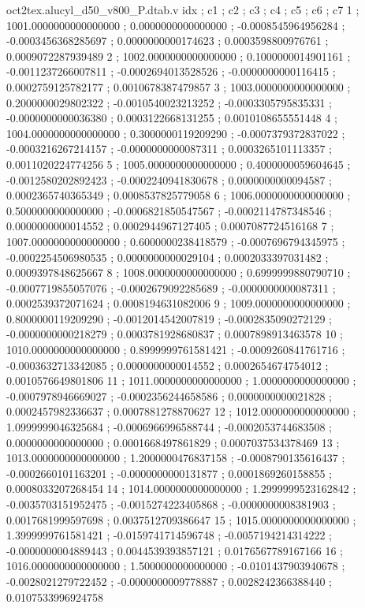 \begin{filecontents}[overwrite]{oct2tex.alucyl_d50_v800_P.dtab.v}
idx ; c1 ; c2 ; c3 ; c4 ; c5 ; c6 ; c7
1 ; 1001.0000000000000000 ; 0.0000000000000000 ; -0.0008545964956284 ; -0.0003456368285697 ; 0.0000000000174623 ; 0.0003598800976761 ; 0.0009072287939489
2 ; 1002.0000000000000000 ; 0.1000000014901161 ; -0.0011237266007811 ; -0.0002694013528526 ; -0.0000000000116415 ; 0.0002759125782177 ; 0.0010678387479857
3 ; 1003.0000000000000000 ; 0.2000000029802322 ; -0.0010540023213252 ; -0.0003305795835331 ; -0.0000000000036380 ; 0.0003122668131255 ; 0.0010108655551448
4 ; 1004.0000000000000000 ; 0.3000000119209290 ; -0.0007379372837022 ; -0.0003216267214157 ; -0.0000000000087311 ; 0.0003265101113357 ; 0.0011020224774256
5 ; 1005.0000000000000000 ; 0.4000000059604645 ; -0.0012580202892423 ; -0.0002240941830678 ; 0.0000000000094587 ; 0.0002365740365349 ; 0.0008537825779058
6 ; 1006.0000000000000000 ; 0.5000000000000000 ; -0.0006821850547567 ; -0.0002114787348546 ; 0.0000000000014552 ; 0.0002944967127405 ; 0.0007087724516168
7 ; 1007.0000000000000000 ; 0.6000000238418579 ; -0.0007696794345975 ; -0.0002254506980535 ; 0.0000000000029104 ; 0.0002033397031482 ; 0.0009397848625667
8 ; 1008.0000000000000000 ; 0.6999999880790710 ; -0.0007719855057076 ; -0.0002679092285689 ; -0.0000000000087311 ; 0.0002539372071624 ; 0.0008194631082006
9 ; 1009.0000000000000000 ; 0.8000000119209290 ; -0.0012014542007819 ; -0.0002835090272129 ; -0.0000000000218279 ; 0.0003781928680837 ; 0.0007898913463578
10 ; 1010.0000000000000000 ; 0.8999999761581421 ; -0.0009260841761716 ; -0.0003632713342085 ; 0.0000000000014552 ; 0.0002654674754012 ; 0.0010576649801806
11 ; 1011.0000000000000000 ; 1.0000000000000000 ; -0.0007978946669027 ; -0.0002356244658586 ; 0.0000000000021828 ; 0.0002457982336637 ; 0.0007881278870627
12 ; 1012.0000000000000000 ; 1.0999999046325684 ; -0.0006966996588744 ; -0.0002053744683508 ; 0.0000000000000000 ; 0.0001668497861829 ; 0.0007037534378469
13 ; 1013.0000000000000000 ; 1.2000000476837158 ; -0.0008790135616437 ; -0.0002660101163201 ; -0.0000000000131877 ; 0.0001869260158855 ; 0.0008033207268454
14 ; 1014.0000000000000000 ; 1.2999999523162842 ; -0.0035703151952475 ; -0.0015274223405868 ; -0.0000000008381903 ; 0.0017681999597698 ; 0.0037512709386647
15 ; 1015.0000000000000000 ; 1.3999999761581421 ; -0.0159741714596748 ; -0.0057194214314222 ; -0.0000000004889443 ; 0.0044539393857121 ; 0.0176567789167166
16 ; 1016.0000000000000000 ; 1.5000000000000000 ; -0.0101437903940678 ; -0.0028021279722452 ; -0.0000000009778887 ; 0.0028242366388440 ; 0.0107533996924758

\end{filecontents}
